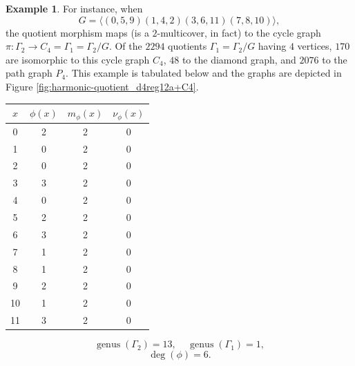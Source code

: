 \documentclass[12pt,letterpaper]{article}
\theoremstyle{definition}
\newtheorem{example}[theorem]{Example}
\DeclareMathOperator{\genus}{genus}
\begin{document}
\begin{example}
{For instance, when
\[
G = \langle (0,5,9)(1,4,2)(3,6,11)(7,8,10) \rangle ,
\]
the quotient morphism maps (is a $2$-multicover, in fact) to the cycle graph
$\pi: \Gamma_2\to C_4=\Gamma_1=\Gamma_2/G $.
Of the $2294$ quotients $\Gamma_1=\Gamma_2/G$ having $4$ vertices,
$170$ are isomorphic to this cycle graph $C_4$, $48$ to the diamond graph,
and $2076$ to the path graph $P_4$.
This example
is tabulated below and the graphs are depicted in
Figure \ref{fig:harmonic-quotient_d4reg12a+C4}. 

\begin{center}
\begin{tabular}{c|c|c|c}  
  $x$ & $\phi(x)$ & $m_\phi(x)$ & $\nu_\phi(x)$ \\ \hline
  0   &    2   &        2         &  0   \\ 
  1   &    0   &        2         &  0  \\ 
  2   &    0   &        2         &  0  \\ 
  3   &    3   &        2         &  0  \\ 
  4   &    0   &        2         &  0   \\
  5   &    2   &        2         &  0   \\
  6   &    3   &        2         &  0   \\
  7   &    1   &        2         &  0   \\
  8   &    1   &        2         &  0   \\
  9   &    2   &        2         &  0   \\
  10   &   1   &        2         &  0  \\   
  11   &   3   &        2         &  0  \\
\end{tabular}
\end{center}

\[
  \genus(\Gamma_2) =13,\ \ \ \ \
  \genus(\Gamma_1) =1,
\]
\[
\deg(\phi) =6.
\]

}
\end{example}
\end{document}
